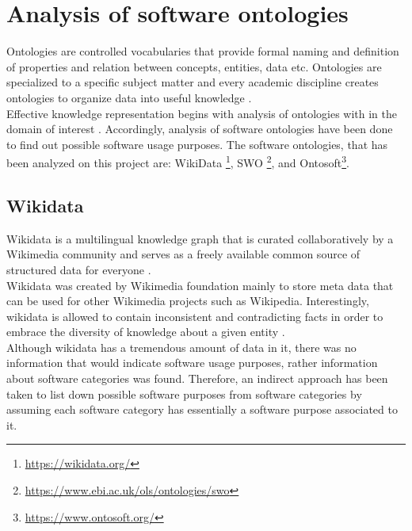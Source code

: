\section{Analysis of software ontologies }
\label{sec:purpose:ontologies}

Ontologies are controlled vocabularies that provide formal naming and definition of properties and relation between concepts, entities, data etc.  Ontologies  are specialized  to a specific subject matter and every academic discipline creates ontologies to organize data into useful knowledge \citep{enwiki:1060388948}. \\

Effective knowledge representation begins with analysis of ontologies with in the domain of interest \citep{chandrasekaran1999ontologies}. Accordingly, analysis of software ontologies have been done to find out possible software usage purposes. The software ontologies, that has been analyzed on this project are: WikiData \footnote{\url{https://wikidata.org/}}, \ac{SWO} \footnote{\url{https://www.ebi.ac.uk/ols/ontologies/swo}}, and Ontosoft\footnote{\url{https://www.ontosoft.org/}}. 

 
\subsection{Wikidata}
\label{subsec:purpose:ontologies:Wikidata}

Wikidata is a multilingual knowledge graph that is curated collaboratively by a Wikimedia community and serves as a freely available common source of structured data for everyone \citep{enwiki:1060114687, enwiki:1060408581}. \\

Wikidata was created by Wikimedia foundation mainly to store meta data that can be used for other Wikimedia projects such as Wikipedia. Interestingly, wikidata is allowed to contain inconsistent and contradicting facts in order to embrace the diversity of knowledge about a given entity \citep{vrandevcic2012wikidata}. \\

Although wikidata has a tremendous amount of data in it, there was no information that would indicate software usage purposes, rather information about software categories was found. Therefore, an indirect approach has been taken to list down possible software purposes from software categories by assuming each software category has essentially a software purpose associated to it. \\

